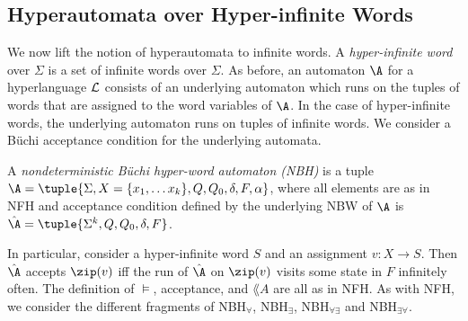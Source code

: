 \subsection{Hyperautomata over Hyper-infinite Words}

We now lift the notion of hyperautomata to infinite words. 
A {\em hyper-infinite word} over $\Sigma$ is a set of infinite words over $\Sigma$. 
As before, an automaton $\A$ for a hyperlanguage $\cal L$ consists of an underlying automaton which runs on the tuples of words that are assigned to the word variables of $\A$. In the case of hyper-infinite words, the underlying automaton runs on tuples of infinite words. We consider a B{\"u}chi acceptance condition for the underlying automata. 

\begin{definition}
A {\em nondeterministic B{\"u}chi hyper-word automaton (NBH)} is a tuple $\A = 
\tuple{\Sigma, X=\{x_1,\ldots x_k\}, Q, Q_0, \delta, F, \alpha}$, where all 
elements are as in NFH and acceptance condition defined by the underlying NBW 
of $\A$ is $\hat{\A} = \tuple{\Sigma^k,Q,Q_0,\delta,F}$.

\end{definition}

In particular, consider a hyper-infinite word $S$ and an 
assignment $v:X\rightarrow S$. Then $\hat\A$ accepts $\zip(v)$ iff the run of 
$\hat\A$ on $\zip(v)$ visits some state in $F$ infinitely often. 
The definition of $\models$, acceptance, and $\lang{A}$ are all as in NFH.
As with NFH, we consider the different fragments of NBH$_\forall$, NBH$_\exists$, NBH$_{\forall\exists}$ and NBH$_{\exists\forall}$.

